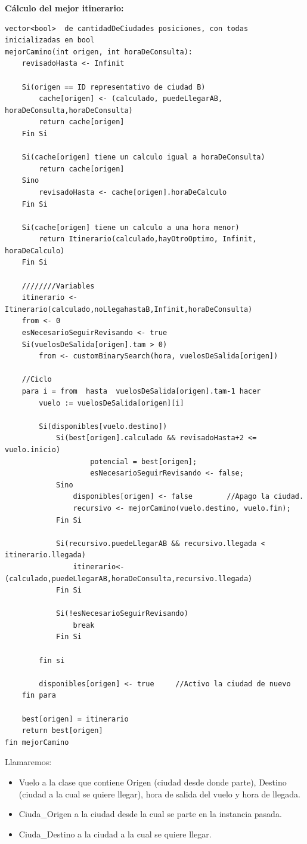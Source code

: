 \documentclass[10pt,a4paper]{article}
\begin{document}
\textbf{Cálculo del mejor itinerario:}\\

\begin{lstlisting}
vector<bool>  de cantidadDeCiudades posiciones, con todas inicializadas en bool
mejorCamino(int origen, int horaDeConsulta):
	revisadoHasta <- Infinit	
	
	Si(origen == ID representativo de ciudad B)
		cache[origen] <- (calculado, puedeLlegarAB, horaDeConsulta,horaDeConsulta)
		return cache[origen]
	Fin Si
	
	Si(cache[origen] tiene un calculo igual a horaDeConsulta)
		return cache[origen]	
	Sino
		revisadoHasta <- cache[origen].horaDeCalculo
	Fin Si
	
	Si(cache[origen] tiene un calculo a una hora menor)
	 	return Itinerario(calculado,hayOtroOptimo, Infinit, horaDeCalculo)
	Fin Si
	
	////////Variables
	itinerario <- Itinerario(calculado,noLlegahastaB,Infinit,horaDeConsulta)
	from <- 0
	esNecesarioSeguirRevisando <- true
	Si(vuelosDeSalida[origen].tam > 0)
		from <- customBinarySearch(hora, vuelosDeSalida[origen])
	
	//Ciclo
	para i = from  hasta  vuelosDeSalida[origen].tam-1 hacer
		vuelo := vuelosDeSalida[origen][i]

		Si(disponibles[vuelo.destino])
			Si(best[origen].calculado && revisadoHasta+2 <= vuelo.inicio)
					potencial = best[origen];
					esNecesarioSeguirRevisando <- false;
			Sino			
				disponibles[origen] <- false		//Apago la ciudad.
				recursivo <- mejorCamino(vuelo.destino, vuelo.fin);
			Fin Si
			
			Si(recursivo.puedeLlegarAB && recursivo.llegada < itinerario.llegada)
				itinerario<-(calculado,puedeLlegarAB,horaDeConsulta,recursivo.llegada)
			Fin Si
			
			Si(!esNecesarioSeguirRevisando)
				break
			Fin Si
			
		fin si
		
		disponibles[origen] <- true		//Activo la ciudad de nuevo
	fin para
	
	best[origen] = itinerario
	return best[origen]
fin mejorCamino 
\end{lstlisting}
\newpage

Llamaremos:
\begin{itemize}
\item Vuelo a la clase que contiene Origen (ciudad desde donde parte), Destino (ciudad a la cual se quiere llegar), hora de salida del vuelo y hora de llegada.
\item Ciuda\_Origen a la ciudad desde la cual se parte en la instancia pasada.
\item Ciuda\_Destino a la ciudad a la cual se quiere llegar.\\
\end{itemize}
\end{document}
